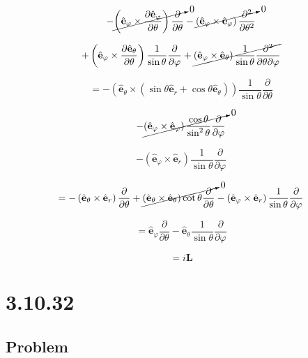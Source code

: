 \documentclass[12pt]{article}
\begin{document}
\[
    - \cancelto{0}{\left(\hat{\mathbf{e}}_\varphi \times \frac{\partial \hat{\mathbf{e}}_\varphi}{\partial \theta}\right)
        \frac{\partial}{\partial \theta}}
    - \cancelto{0}{\left(\hat{\mathbf{e}}_\varphi \times \hat{\mathbf{e}}_\varphi\right)
        \frac{\partial^2}{\partial \theta^2}}
\]

\[
    + \left(\hat{\mathbf{e}}_\varphi \times \frac{\partial \hat{\mathbf{e}}_\theta}{\partial \theta}\right)
    \frac{1}{\sin{\theta}} \frac{\partial}{\partial \varphi}
    + \cancel{\left(\hat{\mathbf{e}}_\varphi \times \hat{\mathbf{e}}_\theta\right)
        \frac{1}{\sin{\theta}} \frac{\partial^2}{\partial \theta \partial \varphi}}
\]

\[
    = - \left(
    \hat{\mathbf{e}}_\theta \times \left(\sin \theta \hat{\mathbf{e}}_r + \cos \theta \hat{\mathbf{e}}_\theta\right)
    \right)
    \frac{1}{\sin{\theta}} \frac{\partial}{\partial \theta}
\]

\[
    - \cancelto{0}{\left(\hat{\mathbf{e}}_\varphi \times \hat{\mathbf{e}}_\varphi\right)
    \frac{\cos{\theta}}{\sin^2{\theta}} \frac{\partial}{\partial \varphi}}
\]

\[
    - \left(\hat{\mathbf{e}}_\varphi \times \hat{\mathbf{e}}_r\right)
    \frac{1}{\sin{\theta}} \frac{\partial}{\partial \varphi}
\]

\[
    = - \left(\hat{\mathbf{e}}_\theta \times \hat{\mathbf{e}}_r\right)
    \frac{\partial}{\partial \theta}
    + \cancelto{0}{\left(\hat{\mathbf{e}}_\theta \times \hat{\mathbf{e}}_\theta\right)
        \cot{\theta} \frac{\partial}{\partial \theta}}
    - \left(\hat{\mathbf{e}}_\varphi \times \hat{\mathbf{e}}_r\right)
    \frac{1}{\sin{\theta}} \frac{\partial}{\partial \varphi}
\]

\[
    = \hat{\mathbf{e}}_\varphi \frac{\partial}{\partial \theta}
    - \hat{\mathbf{e}}_\theta \frac{1}{\sin{\theta}} \frac{\partial}{\partial \varphi}
\]

\[
    = i \textbf{L}
\]

\section{3.10.32}

\subsection{Problem}
\end{document}
